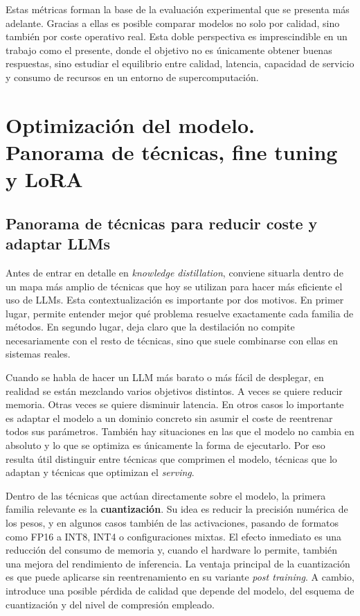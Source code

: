 Estas métricas forman la base de la evaluación experimental que se presenta más adelante. Gracias a ellas es posible comparar modelos no solo por calidad, sino también por coste operativo real. Esta doble perspectiva es imprescindible en un trabajo como el presente, donde el objetivo no es únicamente obtener buenas respuestas, sino estudiar el equilibrio entre calidad, latencia, capacidad de servicio y consumo de recursos en un entorno de supercomputación.

\section{Optimización del modelo. Panorama de técnicas, fine tuning y LoRA}
\label{sec:optim-modelo}

\subsection{Panorama de técnicas para reducir coste y adaptar LLMs}
\label{sec:panorama-opt}

Antes de entrar en detalle en \textit{knowledge distillation}, conviene situarla dentro de un mapa más amplio de técnicas que hoy se utilizan para hacer más eficiente el uso de LLMs. Esta contextualización es importante por dos motivos. En primer lugar, permite entender mejor qué problema resuelve exactamente cada familia de métodos. En segundo lugar, deja claro que la destilación no compite necesariamente con el resto de técnicas, sino que suele combinarse con ellas en sistemas reales.

Cuando se habla de hacer un LLM más barato o más fácil de desplegar, en realidad se están mezclando varios objetivos distintos. A veces se quiere reducir memoria. Otras veces se quiere disminuir latencia. En otros casos lo importante es adaptar el modelo a un dominio concreto sin asumir el coste de reentrenar todos sus parámetros. También hay situaciones en las que el modelo no cambia en absoluto y lo que se optimiza es únicamente la forma de ejecutarlo. Por eso resulta útil distinguir entre técnicas que comprimen el modelo, técnicas que lo adaptan y técnicas que optimizan el \textit{serving}.

Dentro de las técnicas que actúan directamente sobre el modelo, la primera familia relevante es la \textbf{cuantización}. Su idea es reducir la precisión numérica de los pesos, y en algunos casos también de las activaciones, pasando de formatos como FP16 a INT8, INT4 o configuraciones mixtas. El efecto inmediato es una reducción del consumo de memoria y, cuando el hardware lo permite, también una mejora del rendimiento de inferencia. La ventaja principal de la cuantización es que puede aplicarse sin reentrenamiento en su variante \textit{post training}. A cambio, introduce una posible pérdida de calidad que depende del modelo, del esquema de cuantización y del nivel de compresión empleado.

